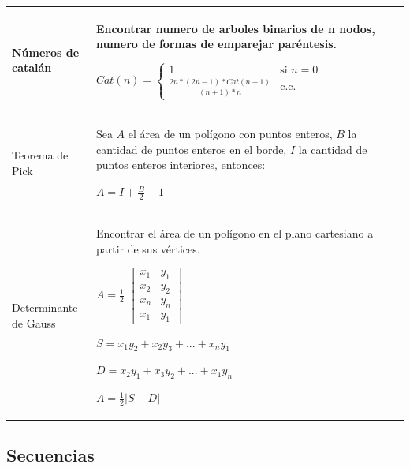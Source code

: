 \documentclass[10pt,landscape,twocolumn,letterpaper,twosided]{article}
\begin{document}
\begin{center}
{\begin{supertabular}{|p{2.2cm}|p{8.2cm}|}
					Números de catalán & Encontrar numero de arboles binarios de n nodos, numero 
					de formas de emparejar paréntesis.
					
					{\large
					$Cat(n) = 	
					\begin{cases}
						1 & \text{si $n = 0$}\\
						\frac{2n*(2n-1) * Cat(n-1)}{(n+1)*n} & \text{c.c.}
					\end{cases}
					$}
					\\ \hline
					
					Teorema de Pick & Sea $A$ el área de un polígono con puntos enteros, $B$ la cantidad de puntos 
					enteros en el borde, $I$ la cantidad de puntos enteros interiores, entonces:
					
					$A = I + \frac{B}{2} - 1$
					\vspace{1mm}
					\\ \hline
					
					Determinante de Gauss & Encontrar el área de un polígono en el plano cartesiano a partir de 
					sus vértices.
					
					{\large$A = \frac{1}{2} $}
					{\large $ \begin{bmatrix}
						x_{1} & y_{1} \\ 
						x_{2} & y_{2} \\ 
						x_{n} & y_{n} \\ 
						x_{1} & y_{1} 
					\end{bmatrix}$ }
					
					\vspace{1mm}
					{\large $S = x_{1}y_{2} + x_{2}y_{3} +...+ x_{n}y_{1}$}
					
					\vspace{1mm}
					{\large $D = x_{2}y_{1} + x_{3}y_{2} +...+ x_{1}y_{n}$} 
					
					\vspace{1mm}
					{\large $A = \frac{1}{2} |S - D|$}
					\\ \hline
					
				\end{supertabular}
				}
			\end{center}

			
		\subsection{Secuencias}
		
\end{document}

